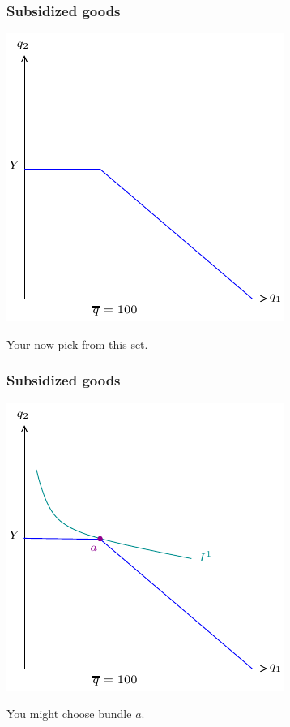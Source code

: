 \documentclass[xcolor=pdftex,dvipsnames]{beamer}
\begin{document}
\begin{frame}
\frametitle{Subsidized goods}
\begin{center}
\includegraphics{pics/Subsidy3}
\end{center}
Your now pick from this set.
\end{frame}


\begin{frame}
\frametitle{Subsidized goods}
\begin{center}
\includegraphics{pics/Subsidy4}
\end{center}
You might choose bundle $a$.
\end{frame}
\end{document}
